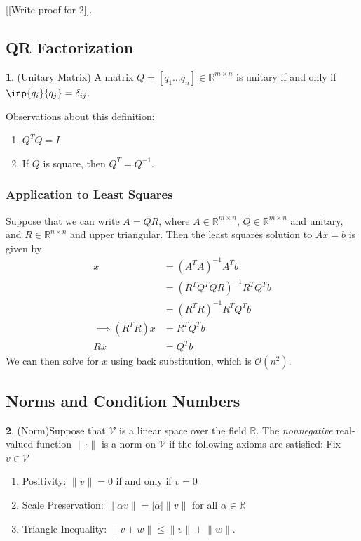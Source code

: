 \documentclass[12pt]{article}
\theoremstyle{definition}
\newtheorem{definition}{\color{NavyBlue}{\textbf{Definition}}}
\newcommand{\R}{\mathbb{R}}
\newcommand{\norm}[1]{\lVert#1\rVert}
\theoremstyle{definition}
\begin{document}
[[Write proof for 2]].

\subsection{QR Factorization}
\begin{definition}(Unitary Matrix)
A matrix $Q = [q_1 \ldots q_n] \in \R^{m\times n}$ is unitary if and only if $\inp{q_i}{q_j} = \delta_{ij}$.
\end{definition}

Observations about this definition:
\begin{enumerate}
	\item $Q^T Q = I$
	\item If $Q$ is square, then $Q^T = Q^{-1}$.
\end{enumerate}

\subsubsection{Application to Least Squares}
Suppose that we can write $A = QR$, where $A \in \R^{ m \times n}$, $Q \in \R^{ m \times n}$ and unitary, and $R \in \R^{n \times n}$ and upper triangular. Then the least squares solution to $Ax = b$ is given by
\begin{align*}
x &= (A^T A)^{-1} A^T b \\
&= (R^T Q^T Q R)^{-1} R^T Q^T b \\
&= (R^T R)^{-1} R^T Q^T b \\
\implies (R^T R) x &= R^T Q^T b \\
R x &= Q^T b \tag{assume $R$ is invertible (i.e. no zeros on the diagonal)}
\end{align*}
We can then solve for $x$ using back substitution, which is $\mathcal{O}(n^2)$.


\subsection{Norms and Condition Numbers}
\begin{definition}(Norm)\label{norm}
Suppose that $\mathcal{V}$ is a linear space over the field $\R$. The \textit{nonnegative} real-valued function $\norm{\cdot}$ is a norm on $\mathcal{V}$ if the following axioms are satisfied: Fix $v \in \mathcal{V}$
\begin{enumerate}
	\item Positivity: $\norm{v} = 0$ if and only if $v = 0$
	\item Scale Preservation: $\norm{\alpha v} = |\alpha| \norm{v}$ for all $\alpha \in \R$
	\item Triangle Inequality: $\norm{v + w} \leq \norm{v} + \norm{w}$.
\end{enumerate}
\end{definition}
\end{document}
